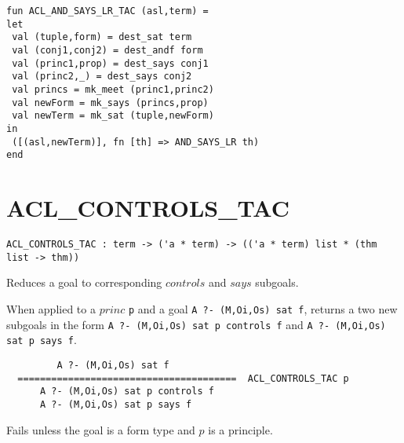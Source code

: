 \IMPLEMENTATION
\begin{holboxed}
\begin{verbatim}
fun ACL_AND_SAYS_LR_TAC (asl,term) =
let
 val (tuple,form) = dest_sat term
 val (conj1,conj2) = dest_andf form
 val (princ1,prop) = dest_says conj1
 val (princ2,_) = dest_says conj2
 val princs = mk_meet (princ1,princ2)
 val newForm = mk_says (princs,prop)
 val newTerm = mk_sat (tuple,newForm)
in
 ([(asl,newTerm)], fn [th] => AND_SAYS_LR th)
end
\end{verbatim}
\end{holboxed}

\SEEALSO
\ENDDOC

\section{ACL\_CONTROLS\_TAC}



\small{
\begin{lstlisting}[breaklines]
ACL_CONTROLS_TAC : term -> ('a * term) -> (('a * term) list * (thm list -> thm))
\end{lstlisting}}\egroup


\SYNOPSIS
Reduces a goal to corresponding $controls$ and $says$ subgoals.

\DESCRIBE When applied to a $princ$ \texttt{p} and a goal \texttt{A ?- (M,Oi,Os) sat f}, returns a two new subgoals in the form \texttt{A ?- (M,Oi,Os) sat p controls f} and \texttt{A ?- (M,Oi,Os) sat p says f}.
\begin{verbatim}
         A ?- (M,Oi,Os) sat f
  =======================================  ACL_CONTROLS_TAC p
      A ?- (M,Oi,Os) sat p controls f     
      A ?- (M,Oi,Os) sat p says f
\end{verbatim}

\FAILURE 
Fails unless the goal is a form type and $p$ is a principle.


